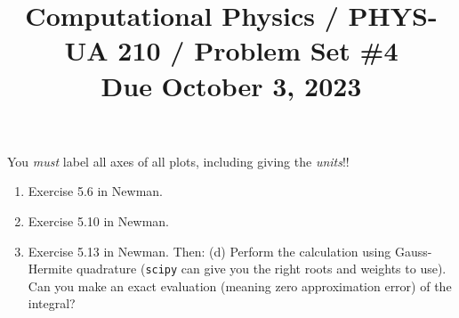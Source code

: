 \documentclass[11pt, preprint]{aastex}
\begin{document}
\title{\bf Computational Physics / PHYS-UA 210 / Problem Set \#4
\\ Due October 3, 2023 }

You {\it must} label all axes of all plots, including giving the {\it
  units}!!

\begin{enumerate}
  \item Exercise 5.6 in Newman. 
  \item Exercise 5.10 in Newman.
  \item Exercise 5.13 in Newman. Then: (d) Perform the calculation
    using Gauss-Hermite quadrature ({\tt scipy} can give you the right
    roots and weights to use). Can you make an exact evaluation
    (meaning zero approximation error) of the integral?
\end{enumerate}
\end{document}
